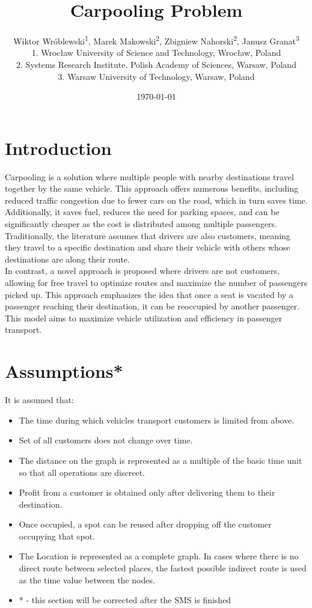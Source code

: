 \documentclass{article}
\title{Carpooling Problem}
\author{
 Wiktor Wróblewski\textsuperscript{1}, Marek Makowski\textsuperscript{2}, Zbigniew Nahorski\textsuperscript{2}, Janusz Granat\textsuperscript{3}\\
 1. Wrocław University of Science and Technology, Wrocław, Poland\\
 2. Systems Research Institute, Polish Academy of Sciences, Warsaw, Poland\\
 3. Warsaw University of Technology, Warsaw, Poland
}
\date{\today}
\begin{document}
\maketitle
\linenumbers

\section{Introduction}
Carpooling is a solution where multiple people with nearby destinations travel together by the same vehicle. This approach offers numerous benefits, including reduced traffic congestion due to fewer cars on the road, which in turn saves time. Additionally, it saves fuel, reduces the need for parking spaces, and can be significantly cheaper as the cost is distributed among multiple passengers. Traditionally, the literature assumes that drivers are also customers, meaning they travel to a specific destination and share their vehicle with others whose destinations are along their route.\\
In contrast, a novel approach is proposed where drivers are not customers, allowing for free travel to optimize routes and maximize the number of passengers picked up. This approach emphasizes the idea that once a seat is vacated by a passenger reaching their destination, it can be reoccupied by another passenger. This model aims to maximize vehicle utilization and efficiency in passenger transport.

\section{Assumptions*}
It is assumed that:
\begin{itemize}[left=0pt]
    \item The time during which vehicles transport customers is limited from above.
    \item Set of all customers does not change over time.
    \item The distance on the graph is represented as a multiple of the basic time unit so that all operations are discreet.
    \item Profit from a customer is obtained only after delivering them to their destination.
    \item Once occupied, a spot can be reused after dropping off the customer occupying that spot.
    \item The Location is represented as a complete graph. In cases where there is no direct route between selected places, the fastest possible indirect route is used as the time value between the nodes.
    \item * - this section will be corrected after the SMS is finished
\end{itemize}
\end{document}
